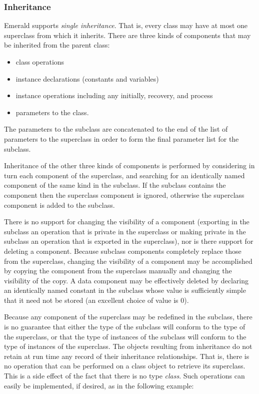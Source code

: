 \subsubsection*{Inheritance}
Emerald supports {\em single inheritance}.  That is, every class may have at
most one superclass from which it inherits.  There are three kinds of
components that may be
inherited from the parent class:
\begin{itemize}
  \item{} class operations
  \item{} instance declarations (constants and variables)
  \item{} instance operations including any initially, recovery, and process
  \item{} parameters to the class.
\end{itemize}
The parameters to the subclass are concatenated to the end of the list of
parameters to the
superclass in order to form the final parameter list for the subclass.

Inheritance of the other three kinds of components is performed by
considering in turn each component of the
superclass, and searching for an identically named component of the same
kind in the subclass.  If the subclass contains the component then the
superclass component is ignored, otherwise the superclass component is added
to the subclass.

There is no support for changing the visibility of a component (exporting in
the subclass an
operation that is private in the superclass or making private in the
subclass an operation
that is exported in the superclass), nor is there support for deleting a
component.  Because subclass components completely replace those from the
superclass, changing the visibility of a component may be accomplished by
copying the component from the superclass manually and changing the
visibility of the copy.
A data component may be effectively deleted by declaring an
identically named constant in the subclass whose value is sufficiently
simple that it need not be stored (an excellent choice of value is 0).

Because any component of the superclass may be redefined in the subclass,
there is no guarantee that either the type of the subclass will conform to
the type of the superclass, or that the type of instances of the subclass
will conform to the type of instances of the superclass.
The objects resulting from inheritance do not
retain at run time any record of their inheritance relationships.  That is,
there is no operation that can be performed on a class object to retrieve
its superclass.  This is a
side effect of the fact that there is no type {\it class}.  Such operations
can easily be implemented, if desired, as in the following example:

